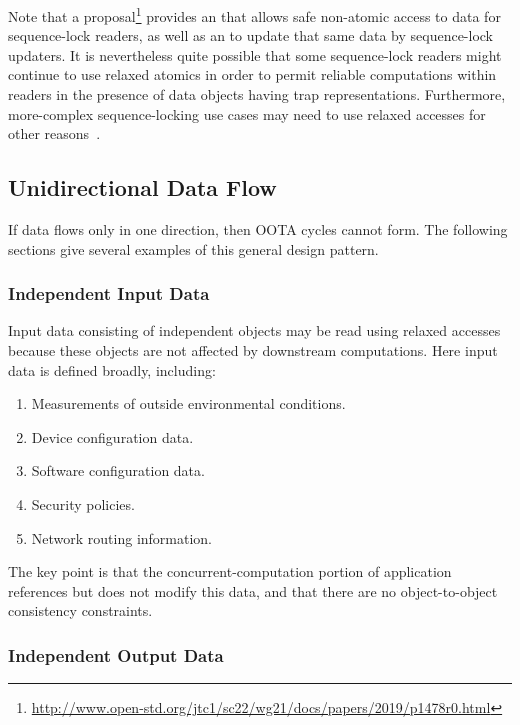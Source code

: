 \documentclass[10]{article}
\begin{document}
Note that a proposal\footnote{
	\url{http://www.open-std.org/jtc1/sc22/wg21/docs/papers/2019/p1478r0.html}}
provides an  that allows safe
non-atomic access to data for sequence-lock readers, as well as an
 to update that same data by
sequence-lock updaters.
It is nevertheless quite possible that some sequence-lock readers
might continue to use relaxed atomics in order to permit reliable
computations within readers in the presence of data objects having
trap representations.
Furthermore, more-complex sequence-locking use cases may need to
use relaxed accesses for other
reasons~\cite{NeilBrown2015PathnameLookup,NeilBrown2015RCUwalk}.

\subsection{Unidirectional Data Flow}
\label{sec:Unidirectional Data Flow}

If data flows only in one direction, then OOTA cycles cannot form.
The following sections give several examples of this general design
pattern.

\subsubsection{Independent Input Data}
\label{sec:Independent Input Data}

Input data consisting of independent objects may be read using relaxed
accesses because these objects are not affected by downstream computations.
Here input data is defined broadly, including:

\begin{enumerate}
\item	Measurements of outside environmental conditions.
\item	Device configuration data.
\item	Software configuration data.
\item	Security policies.
\item	Network routing information.
\end{enumerate}

The key point is that the concurrent-computation portion of application
references but does not modify this data, and that there are no
object-to-object consistency constraints.

\subsubsection{Independent Output Data}
\label{sec:Independent Output Data}
\end{document}
